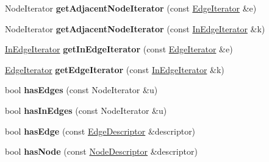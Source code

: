 \begin{DoxyCompactItemize}
\item 
\hypertarget{class_packed_memory_array_impl_a82c4d087eca5b38de0287fd560342995}{
NodeIterator {\bfseries getAdjacentNodeIterator} (const \hyperlink{class_packed_memory_array_1_1_iterator}{EdgeIterator} \&e)}
\label{class_packed_memory_array_impl_a82c4d087eca5b38de0287fd560342995}

\item 
\hypertarget{class_packed_memory_array_impl_a06324c5923bca1898e40f743a9885c4b}{
NodeIterator {\bfseries getAdjacentNodeIterator} (const \hyperlink{class_packed_memory_array_1_1_iterator}{InEdgeIterator} \&k)}
\label{class_packed_memory_array_impl_a06324c5923bca1898e40f743a9885c4b}

\item 
\hypertarget{class_packed_memory_array_impl_a2a6596fa94234d58e8903845ee1563e4}{
\hyperlink{class_packed_memory_array_1_1_iterator}{InEdgeIterator} {\bfseries getInEdgeIterator} (const \hyperlink{class_packed_memory_array_1_1_iterator}{EdgeIterator} \&e)}
\label{class_packed_memory_array_impl_a2a6596fa94234d58e8903845ee1563e4}

\item 
\hypertarget{class_packed_memory_array_impl_ad21ed5f77d58e50d7388146aa19ead4c}{
\hyperlink{class_packed_memory_array_1_1_iterator}{EdgeIterator} {\bfseries getEdgeIterator} (const \hyperlink{class_packed_memory_array_1_1_iterator}{InEdgeIterator} \&k)}
\label{class_packed_memory_array_impl_ad21ed5f77d58e50d7388146aa19ead4c}

\item 
\hypertarget{class_packed_memory_array_impl_a44b445a7fd2278a40e523643578c1244}{
bool {\bfseries hasEdges} (const NodeIterator \&u)}
\label{class_packed_memory_array_impl_a44b445a7fd2278a40e523643578c1244}

\item 
\hypertarget{class_packed_memory_array_impl_a88ac3421f6711d1ec79c038265b7f903}{
bool {\bfseries hasInEdges} (const NodeIterator \&u)}
\label{class_packed_memory_array_impl_a88ac3421f6711d1ec79c038265b7f903}

\item 
\hypertarget{class_packed_memory_array_impl_af11ff382346c6fb7d94a0d0353b9a5c2}{
bool {\bfseries hasEdge} (const \hyperlink{class_p_m_a_edge}{EdgeDescriptor} \&descriptor)}
\label{class_packed_memory_array_impl_af11ff382346c6fb7d94a0d0353b9a5c2}

\item 
\hypertarget{class_packed_memory_array_impl_a585c53f8c1f1c7de701abd48f9eff825}{
bool {\bfseries hasNode} (const \hyperlink{class_p_m_a_node}{NodeDescriptor} \&descriptor)}
\label{class_packed_memory_array_impl_a585c53f8c1f1c7de701abd48f9eff825}


\end{DoxyCompactItemize}

